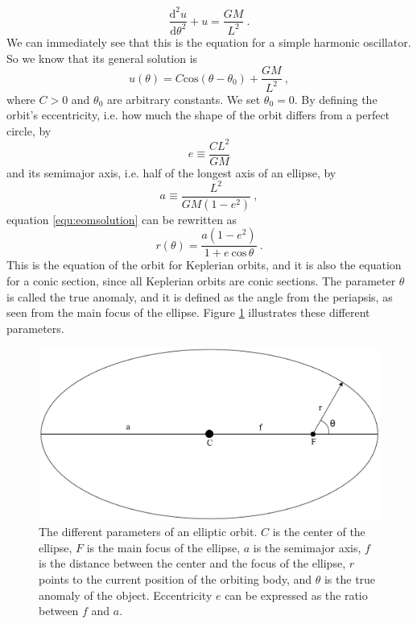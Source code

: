 \documentclass[english, oneside]{HYgradu}
\begin{document}
\begin{equation}
\frac{\mathrm{d}^2 u}{\mathrm{d} \theta^2} + u = \frac{GM}{L^2} \ .
\end{equation}
We can immediately see that this is the equation for a simple harmonic oscillator. So we know that its general solution is
\begin{equation}
u(\theta) = C \mathrm{cos}(\theta - \theta_0) + \frac{GM}{L^2} \label{equ:eomsolution} \ ,
\end{equation}
where $C > 0$ and $\theta_0$ are arbitrary constants. We set $\theta_0 = 0$. By defining the orbit's eccentricity, i.e. how much the shape of the orbit differs from a perfect circle, by 
\begin{equation}
e \equiv \frac{CL^2}{GM}
\end{equation}
and its semimajor axis, i.e. half of the longest axis of an ellipse, by
\begin{equation}
a \equiv \frac{L^2}{GM(1-e^2)} \ ,
\end{equation}
equation \ref{equ:eomsolution} can be rewritten as 
\begin{equation}
r(\theta) = \frac{a (1-e^2)}{1 + e \ \mathrm{cos} \, \theta} \ .
\end{equation}
This is the equation of the orbit for Keplerian orbits, and it is also the equation for a conic section, since all Keplerian orbits are conic sections. The parameter $\theta$ is called the true anomaly, and it is defined as the angle from the periapsis, as seen from the main focus of the ellipse. Figure \ref{fig:ellipse} illustrates these different parameters.

\begin{figure}[h!tb]
\centering
\includegraphics[width=\textwidth]{../images/ellipse.pdf}
\caption{The different parameters of an elliptic orbit. $C$ is the center of the ellipse, $F$ is the main focus of the ellipse, $a$ is the semimajor axis, $f$ is the distance between the center and the focus of the ellipse, $r$ points to the current position of the orbiting body, and $\theta$ is the true anomaly of the object. Eccentricity $e$ can be expressed as the ratio between $f$ and $a$.}
\label{fig:ellipse}
\end{figure}
\end{document}
